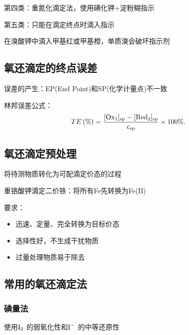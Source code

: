 \begin{eg}
    第四类：重氮化滴定法，使用碘化钾+淀粉糊指示
\end{eg}
\begin{notation}
    第五类：只能在滴定终点时滴入指示
    \begin{eg}
        在溴酸钾中滴入甲基红或甲基橙，单质溴会破坏指示剂
    \end{eg}
\end{notation}
\subsection{氧还滴定的终点误差}%
\label{sub:氧还滴定的终点误差}
误差的产生：EP(End Point)和SP(化学计量点)不一致
\begin{notation}
    林邦误差公式：
    \[
        TE\left( \% \right)=\frac{[\ce{Ox_1}]_{\text{sp}}-[\ce{Red_2}]_{\text{sp}}}{c_{\text{sp}}}\times 100\%
    .\]
\end{notation}
\subsection{氧还滴定预处理}%
\label{sub:氧还滴定预处理}
\begin{notation}
    将待测物质转化为可配滴定价态的过程
\end{notation}
\begin{eg}
重铬酸钾滴定二价铁：将所有Fe先转换为Fe(II)
\end{eg}
要求：
\begin{itemize}
    \item 迅速、定量、完全转换为目标价态
    \item 选择性好，不生成干扰物质
    \item 过量处理物质易于除去
\end{itemize}
\subsection{常用的氧还滴定法}%
\label{sub:常用的氧还滴定法}
\subsubsection*{碘量法}%
\label{subsub:碘量法}
使用$\ce{I_2}$ 的弱氧化性和$\ce{I-}$ 的中等还原性

